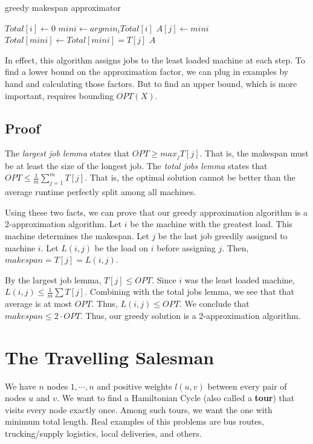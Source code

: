 \documentclass[titlepage, 12pt, leqno]{article}
\begin{document}
\begin{algorithm}
\caption{greedy makespan approximator}
\begin{algorithmic}[1]
        \State $Total[i]\leftarrow 0$
    \EndFor
        \State $mini \leftarrow argmin_{i} Total[i]$
        \State $A[j] \leftarrow mini$
        \State $Total[mini] \leftarrow Total[mini] = T[j]$
    \EndFor
    \State \Return $A$
\EndProcedure 
\end{algorithmic}
\end{algorithm}

In effect, this algorithm assigns jobs to the least loaded machine at each
step. To find a lower bound on the approximation factor, we can plug in
examples by hand and calculating those factors. But to find an upper bound,
which is more important, requires bounding $OPT(X)$. 

\subsection{Proof}
The \textit{largest job lemma} states that $OPT \ge max_{j}T[j]$. That
is, the makespan must be at least the size of the longest job. The
\textit{total jobs lemma} states that $OPT\le \frac{1}{m}\sum_{j=1}^{m}T[j]$.
That is, the optimal solution cannot be better than the average runtime
perfectly split among all machines.

Using these two facts, we can prove that our greedy approximation algorithm
is a 2-approximation algorithm. Let $i$ be the machine with the greatest load.
This machine determines the makespan. Let $j$ be the last job greedily assigned
to machine $i$. Let $L(i,j)$ be the load on $i$ before assigning $j$. Then,
$makespan = T[j] = L(i,j)$.

By the largest job lemma, $T[j] \le OPT$. Since $i$ was the least loaded machine,
$L(i,j) \le \frac{1}{m}\sum T[j]$. Combining with the total jobs lemma, we see 
that that average is at most $OPT$. Thus, $L(i,j) \le OPT$. We conclude that
$makespan \le 2 \cdot OPT$. Thus, our greedy solution is a 2-approximation
algorithm.

\pagebreak
\section{The Travelling Salesman}
We have $n$ nodes $1, \cdots ,n$ and positive weights $l(u,v)$ between
every pair of nodes $u$ and $v$. We want to find a Hamiltonian Cycle (also
called a \textbf{tour}) that visits every node exactly once. Among such tours,
we want the one with minimum total length. Real examples of this problems are
bus routes, trucking/supply logistics, local deliveries, and others.
\end{document}
